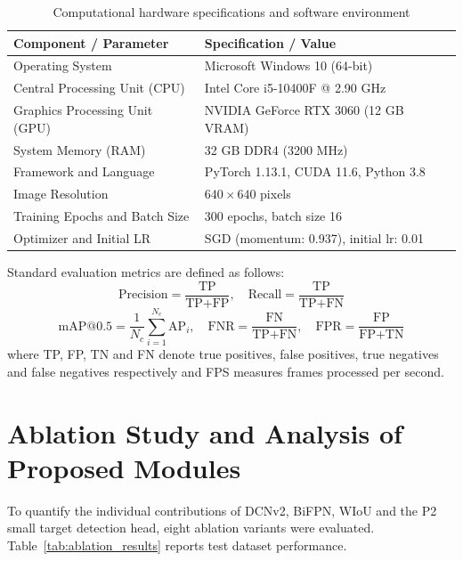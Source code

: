 \documentclass[12pt,a4paper]{report}
\begin{document}
\begin{table}[H]
\centering
\caption{Computational hardware specifications and software environment}
\label{tab:hardware_software}
\vspace{0.2cm}
\setlength{\tabcolsep}{8pt}
\renewcommand{\arraystretch}{1.15}
\small
\begin{tabular}{ll}
\toprule
\textbf{Component / Parameter} & \textbf{Specification / Value} \\
\midrule
Operating System & Microsoft Windows 10 (64-bit) \\
Central Processing Unit (CPU) & Intel Core i5-10400F @ 2.90 GHz \\
Graphics Processing Unit (GPU) & NVIDIA GeForce RTX 3060 (12 GB VRAM) \\
System Memory (RAM) & 32 GB DDR4 (3200 MHz) \\
Framework and Language & PyTorch 1.13.1, CUDA 11.6, Python 3.8 \\
Image Resolution & $640 \times 640$ pixels \\
Training Epochs and Batch Size & 300 epochs, batch size 16 \\
Optimizer and Initial LR & SGD (momentum: 0.937), initial lr: 0.01 \\
\bottomrule
\end{tabular}
\end{table}

Standard evaluation metrics are defined as follows:
\begin{equation}
\text{Precision} = \frac{\text{TP}}{\text{TP} + \text{FP}}, \quad \text{Recall} = \frac{\text{TP}}{\text{TP} + \text{FN}}
\end{equation}
\begin{equation}
\text{mAP@0.5} = \frac{1}{N_c} \sum_{i=1}^{N_c} \text{AP}_i, \quad \text{FNR} = \frac{\text{FN}}{\text{TP} + \text{FN}}, \quad \text{FPR} = \frac{\text{FP}}{\text{FP} + \text{TN}}
\end{equation}
where TP, FP, TN and FN denote true positives, false positives, true negatives and false negatives respectively and FPS measures frames processed per second.

\section{Ablation Study and Analysis of Proposed Modules}

To quantify the individual contributions of DCNv2, BiFPN, WIoU and the P2 small target detection head, eight ablation variants were evaluated. Table~\ref{tab:ablation_results} reports test dataset performance.
\end{document}

